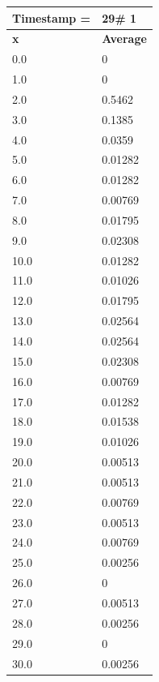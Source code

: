 \begin{tabular}{|l||l|}
\hline
\textbf{Timestamp =} & \textbf{29}\# 1\\\hline
	\textbf{x} & \textbf{Average} \\ \hline
\hline
	0.0 & 0 \\ \hline
	1.0 & 0 \\ \hline
	2.0 & 0.5462 \\ \hline
	3.0 & 0.1385 \\ \hline
	4.0 & 0.0359 \\ \hline
	5.0 & 0.01282 \\ \hline
	6.0 & 0.01282 \\ \hline
	7.0 & 0.00769 \\ \hline
	8.0 & 0.01795 \\ \hline
	9.0 & 0.02308 \\ \hline
	10.0 & 0.01282 \\ \hline
	11.0 & 0.01026 \\ \hline
	12.0 & 0.01795 \\ \hline
	13.0 & 0.02564 \\ \hline
	14.0 & 0.02564 \\ \hline
	15.0 & 0.02308 \\ \hline
	16.0 & 0.00769 \\ \hline
	17.0 & 0.01282 \\ \hline
	18.0 & 0.01538 \\ \hline
	19.0 & 0.01026 \\ \hline
	20.0 & 0.00513 \\ \hline
	21.0 & 0.00513 \\ \hline
	22.0 & 0.00769 \\ \hline
	23.0 & 0.00513 \\ \hline
	24.0 & 0.00769 \\ \hline
	25.0 & 0.00256 \\ \hline
	26.0 & 0 \\ \hline
	27.0 & 0.00513 \\ \hline
	28.0 & 0.00256 \\ \hline
	29.0 & 0 \\ \hline
	30.0 & 0.00256 \\ \hline
\end{tabular}

